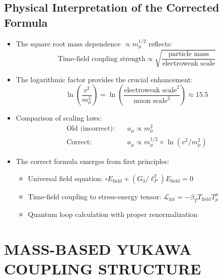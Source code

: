 \documentclass[12pt,a4paper]{article}
\begin{document}
\subsection{Physical Interpretation of the Corrected Formula}
\begin{itemize}
	\item The square root mass dependence $\propto m_\mu^{1/2}$ reflects:
	\begin{equation}
		\text{Time-field coupling strength} \propto \sqrt{\frac{\text{particle mass}}{\text{electroweak scale}}}
	\end{equation}
	
	\item The logarithmic factor provides the crucial enhancement:
	\begin{equation}
		\ln\left(\frac{v^2}{m_\mu^2}\right) = \ln\left(\frac{\text{electroweak scale}^2}{\text{muon scale}^2}\right) \approx 15.5
	\end{equation}
	
	\item Comparison of scaling laws:
	\begin{align}
		\text{Old (incorrect):} &\quad a_\mu \propto m_\mu^2 \\
		\text{Correct:} &\quad a_\mu \propto m_\mu^{1/2} \times \ln(v^2/m_\mu^2)
	\end{align}
	
	\item The correct formula emerges from first principles:
	\begin{itemize}
		\item Universal field equation: $\square E_{\text{field}} + (G_3/\ell_P^2) E_{\text{field}} = 0$
		\item Time-field coupling to stress-energy tensor: $\mathcal{L}_{\text{int}} = -\beta_T T_{\text{field}} T^\mu_\mu$
		\item Quantum loop calculation with proper renormalization
	\end{itemize}
\end{itemize}

\section{MASS-BASED YUKAWA COUPLING STRUCTURE}
\end{document}
